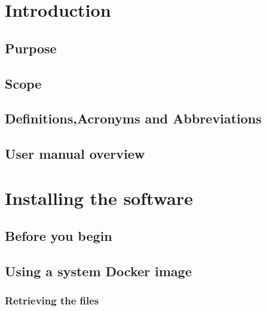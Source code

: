 \documentclass[a4paper,12pt]{article}
\begin{document}
    \tableofcontents
    \section{Introduction}
    	
        \subsection{Purpose}
        
        \subsection {Scope}
        
        
        \subsection{Definitions,Acronyms and Abbreviations}
        
        \subsection{User manual overview}
       
  
    \section{Installing the software}

    	\subsection{Before you begin}
   	
    	\subsection{Using a system Docker image}
    	
    		\subsubsection {Retrieving the files}
    		
\end{document}

